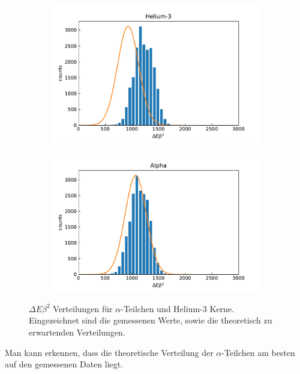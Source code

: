 \begin{figure}[ht]
	\centering
	\begin{subfigure}[c]{0.45\textwidth}
		\centering
		\includegraphics[width=\textwidth]{dat/debeta_Helium-3.pdf}
	\end{subfigure}
	\begin{subfigure}[c]{0.45\textwidth}
		\centering
		\includegraphics[width=\textwidth]{dat/debeta_Alpha.pdf}
	\end{subfigure}
	\caption{$\Delta E \beta^2$ Verteilungen für $\alpha$-Teilchen und Helium-3 Kerne. Eingezeichnet sind die gemessenen Werte, sowie die theoretisch zu erwartenden Verteilungen.}
	\label{fig:debeta}
\end{figure}

Man kann erkennen, dass die theoretische Verteilung der $\alpha$-Teilchen am besten auf den gemessenen Daten liegt.
